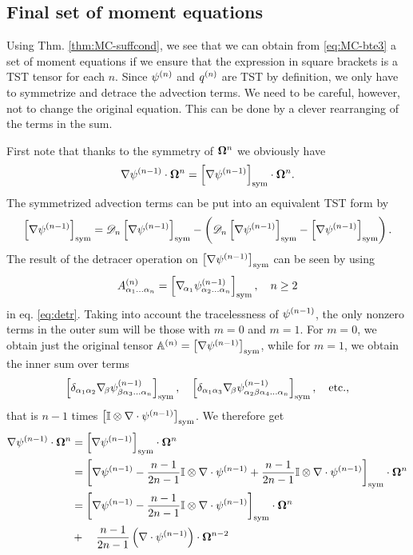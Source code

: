 \subsection{Final set of moment equations}
Using Thm. \ref{thm:MC-suffcond}, we see that we can obtain from \eqref{eq:MC-bte3} a set of moment equations if we
ensure that the expression in square brackets is a TST tensor for each $n$. Since $\fmom$ and $\qmom$ are TST by
definition, we only have to symmetrize and detrace the advection terms. We need to be careful, however, not to change
the original equation. This can be done by a clever rearranging of the terms in the sum.

First note that thanks to the symmetry of $\bomega^n$ we obviously have $$
  \nabla\fmom[n-1]\contr\bomega^n = \Sym{\nabla\fmom[n-1]}\contr\bomega^n.
$$ The symmetrized advection terms can be put into an equivalent TST form by $$
  \Sym{\nabla\fmom[n-1]} = \detr\Sym{\nabla\fmom[n-1]} - \left(\detr\Sym{\nabla\fmom[n-1]} -
  \Sym{\nabla\fmom[n-1]}\right).
$$ The result of the detracer operation on $\Sym{\nabla\fmom[n-1]}$ can be seen by using $$
  \AAA{\alpha_1\ldots\alpha_n} = \Sym{\gradcomp{\alpha_1}\fmom[n-1]_{\alpha_2\ldots\alpha_n}},\quad n \geq 2
$$ in eq. \eqref{eq:detr}. Taking into account the tracelessness of $\fmom[n-1]$, the only nonzero terms in the outer
sum will be those with $m = 0$ and $m = 1$. For $m = 0$, we obtain just the original tensor $\AA =
\Sym{\nabla\fmom[n-1]}$, while for $m = 1$, we obtain the inner sum over terms
\begin{equation*}
  \Sym{\kron{\alpha_1}{\alpha_2}\gradcomp{\beta}\fmom[n-1]_{\beta\alpha_3\ldots\alpha_n}},\quad
  \Sym{\kron{\alpha_1}{\alpha_3}\gradcomp{\beta}\fmom[n-1]_{\alpha_2\beta\alpha_4\ldots\alpha_n}},\quad\mbox{etc.},
\end{equation*}
that is $n-1$ times $\Sym{\eye\otimes\nabla\cdot\fmom[n-1]}$. We therefore get
\begin{equation}
\begin{aligned}\label{eq:MC-split0}
  \nabla\fmom[n-1]\contr\bomega^n &= \Sym{\nabla\fmom[n-1]}\contr\bomega^n\\
    & = \Sym{\nabla\fmom[n-1] - \frac{n-1}{2n-1}\eye\otimes\nabla\cdot\fmom[n-1] + \frac{n-1}{2n-1}\eye\otimes\nabla\cdot\fmom[n-1]}\contr\bomega^n\\
    & = \Sym{\nabla\fmom[n-1] - \frac{n-1}{2n-1}\eye\otimes\nabla\cdot\fmom[n-1]}\contr\bomega^n \\
    & +\quad \frac{n-1}{2n-1}\left(\nabla\cdot\fmom[n-1]\right)\contr\bomega^{n-2}
\end{aligned}
\end{equation}
